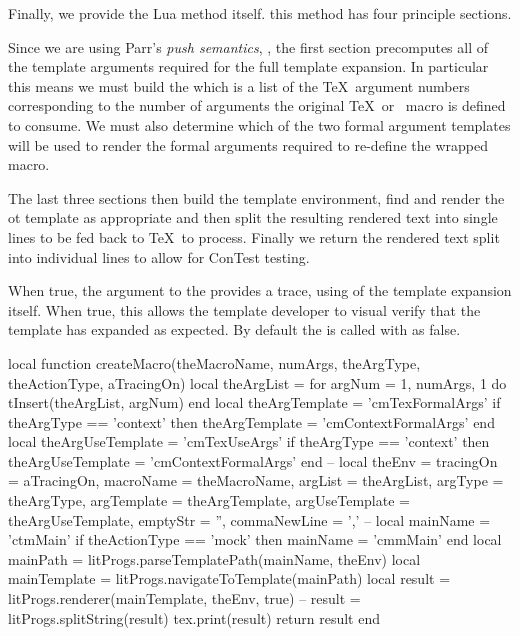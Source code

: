Finally, we provide the Lua  method itself. this method 
has four principle sections. 

Since we are using Parr's \emph{push semantics}, 
\cite{parr2004templateMVC}, the first section precomputes all of the 
template arguments required for the full template expansion. In particular 
this means we must build the  which is a list of the \TeX\ 
argument numbers corresponding to the number of arguments the original 
\TeX\ or \ConTeXt\ macro is defined to consume. We must also determine 
which of the two formal argument templates will be used to render the 
formal arguments required to re-define the wrapped macro. 

The last three sections then build the template environment, find and 
render the \type{ctmMain} ot \type{cmmMain} template as appropriate and 
then split the resulting rendered text into single lines to be fed back to 
\TeX\ to process. Finally we return the rendered text split into 
individual lines to allow for ConTest testing. 

When true, the  argument to the  
provides a trace, using \type{texio.write_nl} of the template expansion 
itself. When true, this allows the template developer to visual verify 
that the template has expanded as expected. By default the 
 is called with  as false. 

\startLuaCode
local function createMacro(theMacroName,
                           numArgs,
                           theArgType,
                           theActionType,
                           aTracingOn)
  local theArgList = { }
  for argNum = 1, numArgs, 1 do
    tInsert(theArgList, argNum)
  end
  local theArgTemplate = 'cmTexFormalArgs'
  if theArgType == 'context' then
    theArgTemplate = 'cmContextFormalArgs'
  end
  local theArgUseTemplate = 'cmTexUseArgs'
  if theArgType == 'context' then
    theArgUseTemplate = 'cmContextFormalArgs'
  end
  --
  local theEnv     = {
    tracingOn      = aTracingOn,
    macroName      = theMacroName,
    argList        = theArgList,
    argType        = theArgType,
    argTemplate    = theArgTemplate,
    argUseTemplate = theArgUseTemplate,
    emptyStr       = '',
    commaNewLine   = ',\n'
  }
  --
  local mainName   = 'ctmMain'
  if theActionType == 'mock' then
    mainName = 'cmmMain'
  end
  local mainPath     = litProgs.parseTemplatePath(mainName, theEnv)
  local mainTemplate = litProgs.navigateToTemplate(mainPath)
  local result       = litProgs.renderer(mainTemplate, theEnv, true)
  --
  result            = litProgs.splitString(result)
  tex.print(result)
  return result
end

